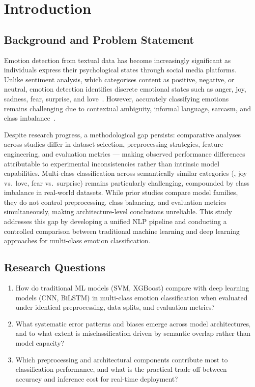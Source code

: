 \section{Introduction}
\label{sec:introduction}

\subsection{Background and Problem Statement}

Emotion detection from textual data has become increasingly significant as individuals express their psychological states through social media platforms. Unlike sentiment analysis, which categorises content as positive, negative, or neutral, emotion detection identifies discrete emotional states such as anger, joy, sadness, fear, surprise, and love~\citep{nandwani2021review, poria2019deeper}. However, accurately classifying emotions remains challenging due to contextual ambiguity, informal language, sarcasm, and class imbalance~\citep{seyeditabari2018emotion}.

Despite research progress, a methodological gap persists: comparative analyses across studies differ in dataset selection, preprocessing strategies, feature engineering, and evaluation metrics --- making observed performance differences attributable to experimental inconsistencies rather than intrinsic model capabilities. Multi-class classification across semantically similar categories (\eg, joy vs.\ love, fear vs.\ surprise) remains particularly challenging, compounded by class imbalance in real-world datasets. While prior studies compare model families, they do not control preprocessing, class balancing, and evaluation metrics simultaneously, making architecture-level conclusions unreliable. This study addresses this gap by developing a unified NLP pipeline and conducting a controlled comparison between traditional machine learning and deep learning approaches for multi-class emotion classification.

\subsection{Research Questions}

\begin{enumerate}[nosep]
    \item[\textbf{RQ1.}] How do traditional ML models (SVM, XGBoost) compare with deep learning models (CNN, BiLSTM) in multi-class emotion classification when evaluated under identical preprocessing, data splits, and evaluation metrics?
    \item[\textbf{RQ2.}] What systematic error patterns and biases emerge across model architectures, and to what extent is misclassification driven by semantic overlap rather than model capacity?
    \item[\textbf{RQ3.}] Which preprocessing and architectural components contribute most to classification performance, and what is the practical trade-off between accuracy and inference cost for real-time deployment?
\end{enumerate}

